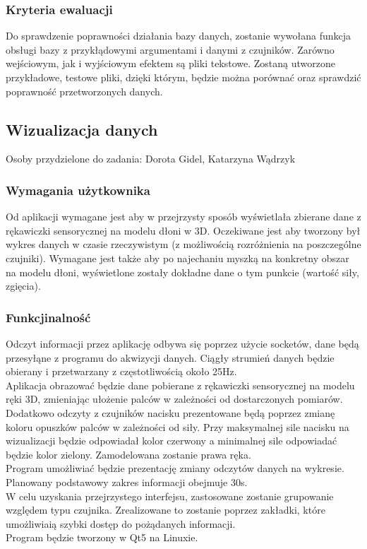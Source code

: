 \documentclass{article}
\begin{document}
\subsubsection{Kryteria ewaluacji}
Do sprawdzenie poprawności działania bazy danych, zostanie wywołana funkcja obsługi bazy z przykłądowymi argumentami i danymi z czujników. Zarówno wejściowym, jak i wyjściowym efektem są pliki tekstowe. Zostaną utworzone przykładowe, testowe pliki, dzięki którym, będzie można porównać oraz sprawdzić poprawność przetworzonych danych.

\subsection{Wizualizacja danych}
Osoby przydzielone do zadania: Dorota Gidel, Katarzyna Wądrzyk
\subsubsection{Wymagania użytkownika}
Od aplikacji wymagane jest aby w przejrzysty sposób wyświetlała zbierane dane z rękawiczki sensorycznej na modelu dłoni w 3D. Oczekiwane jest aby tworzony był wykres danych w czasie rzeczywistym (z możliwością rozróżnienia na poszczególne czujniki). Wymagane jest także aby po najechaniu myszką na konkretny obszar na modelu dłoni, wyświetlone zostały dokładne dane o tym punkcie (wartość siły, zgięcia).
\subsubsection{Funkcjinalność}
Odczyt informacji przez aplikację odbywa się poprzez użycie socketów, dane będą przesyłąne z programu do akwizycji danych. Ciągły strumień danych będzie obierany i przetwarzany z częstotliwością około 25Hz.\\
Aplikacja obrazować będzie dane pobierane z rękawiczki sensorycznej na modelu ręki 3D, zmieniając ułożenie palców w zależności od dostarczonych pomiarów. Dodatkowo odczyty z czujników nacisku prezentowane będą poprzez zmianę koloru opuszków palców w zależności od siły. Przy maksymalnej sile nacisku na wizualizacji będzie odpowiadał kolor czerwony a minimalnej sile odpowiadać będzie kolor zielony. Zamodelowana zostanie prawa ręka.\\
Program umożliwiać będzie prezentację zmiany odczytów danych na wykresie. Planowany podstawowy zakres informacji obejmuje 30s. \\
W celu uzyskania przejrzystego interfejsu, zastosowane zostanie grupowanie względem typu czujnika. Zrealizowane to zostanie poprzez zakładki, które umożliwiaią szybki dostęp do pożądanych informacji. \\
Program będzie tworzony w Qt5 na Linuxie.
\end{document}
